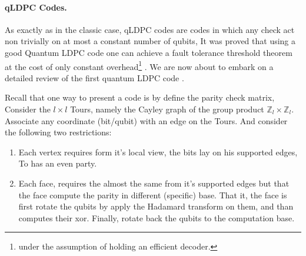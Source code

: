 

  \paragraph{qLDPC Codes.} As exactly as in the classic case, qLDPC codes are codes in which any check act non trivially on at most a constant number of qubits, It was proved that using a good Quantum LDPC code one can achieve a fault tolerance threshold theorem at the cost of only constant overhead\footnote{under the assumption of holding an efficient decoder.} \cite{gottesman2014faulttolerant}. We are now about to embark on a detailed review of the first quantum LDPC code \cite{Dennis_2002}. 

  Recall that one way to present a code is by define the parity check matrix, Consider the $l\times l$ Tours, namely the Cayley graph of the group product  $\mathbb{Z}_{l} \times \mathbb{Z}_{l}$. Associate any coordinate (bit/qubit) with an edge on the Tours. And consider the following two restrictions:

  \begin{enumerate}
    \item Each vertex requires form it's local view, the bits lay on his supported edges, To has an even party. 
    \item Each face, requires the almost the same from it's supported edges but that the face compute the parity in different (specific) base. That it, the face is first rotate the qubits by apply the Hadamard transform on them, and than computes their xor. Finally, rotate back the qubits to the computation base.   
  \end{enumerate}

